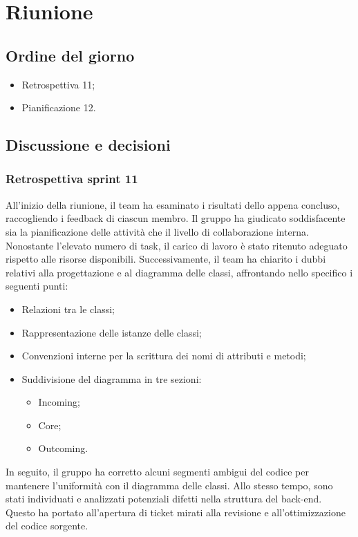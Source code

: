 \section{Riunione}
\subsection{Ordine del giorno}
\begin{itemize}
	\item Retrospettiva  11;
	\item Pianificazione  12.
\end{itemize}

\subsection{Discussione e decisioni}
\subsubsection{Retrospettiva sprint 11}
\par All'inizio della riunione, il team ha esaminato i risultati dello  appena concluso, raccogliendo i feedback di ciascun membro. Il gruppo ha giudicato soddisfacente sia la pianificazione delle attività che il livello di collaborazione interna. Nonostante l'elevato numero di task, il carico di lavoro è stato ritenuto adeguato rispetto alle risorse disponibili. Successivamente, il team ha chiarito i dubbi relativi alla progettazione e al diagramma delle classi, affrontando nello specifico i seguenti punti:
\begin{itemize}
	\item Relazioni tra le classi;
	\item Rappresentazione delle istanze delle classi;
	\item Convenzioni interne per la scrittura dei nomi di attributi e metodi;
	\item Suddivisione del diagramma in tre sezioni:
	\begin{itemize}
		\item Incoming;
		\item Core;
		\item Outcoming.
	\end{itemize}
\end{itemize}

\vspace{0.5\baselineskip}
\par In seguito, il gruppo ha corretto alcuni segmenti ambigui del codice  per mantenere l'uniformità con il diagramma delle classi. Allo stesso tempo, sono stati individuati e analizzati potenziali difetti nella struttura del back-end. Questo ha portato all'apertura di ticket mirati alla revisione e all'ottimizzazione del codice sorgente.

